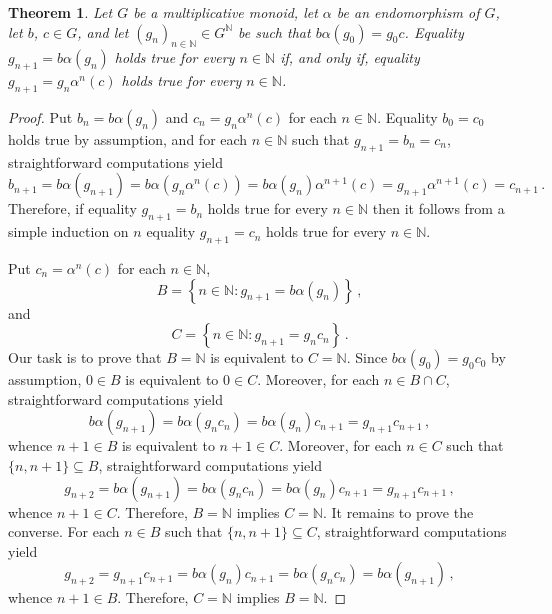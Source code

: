 \documentclass[12pt]{article}
\newcommand{\bZ}{\mathbb{Z}}
\newcommand{\bN}{\mathbb{N}} %
\newtheorem{theorem}{Theorem}
\theoremstyle{definition}
\begin{document}
 
\begin{theorem} 
  Let $G$ be a multiplicative monoid,
  let $\alpha$ be an endomorphism of $G$,
  let $b$, $c \in G$, and
  let $\left( g_n \right)_{n \in \bN} \in G^\bN$ be such that $b \alpha(g_0) = g_0 c$.
  Equality $g_{n + 1} = b \alpha(g_n)$ holds true for every $n \in \bN$ if, and only if, 
  equality $g_{n + 1} = g_n \alpha^n(c)$ holds true for every $n \in \bN$.
\end{theorem}

\begin{proof}
  Put $b_n  = b \alpha(g_n)$ and $c_n =  g_n \alpha^n(c)$ for each $n \in \bN$.
  Equality $b_0  =  c_0$ holds true by assumption,
  and for each $n \in \bN$ such that $g_{n + 1} = b_n = c_n$,
  straightforward computations yield
  $$
  b_{n + 1} = b \alpha(g_{n + 1})
  = b \alpha (g_n \alpha^n(c))
  = b \alpha(g_n) \alpha^{n + 1}(c)
  = g_{n + 1}  \alpha^{n + 1}(c) = c_{n + 1}  \,.
  $$
  Therefore,
  if equality $g_{n + 1} = b_n$ holds true for every $n \in \bN$
  then it follows from a simple induction on $n$  equality $g_{n + 1} = c_n$ holds true for every $n \in \bN$.
  
  Put $c_n =  \alpha^n(c)$ for each $n \in \bN$, 
  $$
  B = \left\{ n \in \bN :g_{n + 1} = b \alpha(g_n) \right\} \,,  
  $$
  and
  $$
  C = \left\{ n \in \bN :g_{n + 1} = g_n c_n \right\} \, .  
  $$
  Our task is to prove that $B = \bN$ is equivalent to $C = \bN$.
  Since $b \alpha(g_0) = g_0 c_0$ by assumption,
  $0 \in B$ is equivalent to $0 \in C$.
  Moreover, for each $n \in B \cap C$,
  straightforward computations yield
  $$
  b \alpha(g_{n + 1})
  = b \alpha (g_n c_n)
  = b \alpha(g_n) c_{n + 1}
  = g_{n + 1} c_{n + 1} \,, 
  $$
  whence $n + 1 \in B$ is equivalent to $n + 1 \in C$.
  Moreover, for each $n \in C$ such that $\{ n, n + 1 \} \subseteq B$,
  straightforward computations yield
  $$
  g_{n + 2}
  = b \alpha(g_{n + 1})
  = b \alpha (g_n c_n)
  = b \alpha(g_n) c_{n + 1}
  = g_{n + 1} c_{n + 1} \,, 
  $$
  whence $n + 1 \in C$.
  Therefore, $B = \bN$ implies $C = \bN$.
  It remains to prove the converse.
  For each $n \in B$ such that $\{ n, n + 1 \} \subseteq C$, straightforward computations yield
  $$
  g_{n + 2}
  = g_{n + 1} c_{n + 1} 
  = b \alpha(g_n) c_{n + 1} 
  = b \alpha\left(g_n c_n  \right)
  = b \alpha(g_{n + 1}) \,, 
  $$
  whence $n + 1 \in B$.
  Therefore, $C = \bN$ implies $B = \bN$.
\end{proof}
\end{document}
